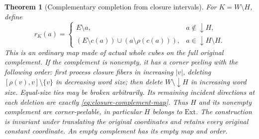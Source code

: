 \documentclass[11pt]{article}
\newtheorem{theorem}{Theorem}[section]
\theoremstyle{definition}
\begin{document}
\begin{theorem}[Complementary completion from closure intervals]
\label{thm:closure-completion}
For $K=W\setminus H$, define
\begin{equation}\label{eq:closure-complement-map}
 r_K(a)=
 \begin{cases}
 E\setminus a,&a\notin\downarrow H,\\
 (E\setminus c(a))\cup(a\setminus\rho(c(a))),&a\in\downarrow H\setminus H.
 \end{cases}
\end{equation}
This is an ordinary map made of actual whole cubes on the full original
complement. If the complement is nonempty, it has a corner peeling with the following order:
first process closure fibers in increasing $|v|$, deleting
$[\rho(v),v]\setminus\{v\}$ in decreasing word size; then delete
$W\setminus\downarrow H$ in increasing word size. Equal-size ties may
be broken arbitrarily. Its remaining incident directions at each deletion
are exactly \eqref{eq:closure-complement-map}.
Thus $H$ and its nonempty complement are corner-peelable, in particular $H$
belongs to $\mathrm{Ext}$. The construction is invariant under translating
the original coordinates and retains every original constant coordinate.
An empty complement has its empty map and order.
\end{theorem}
\end{document}
